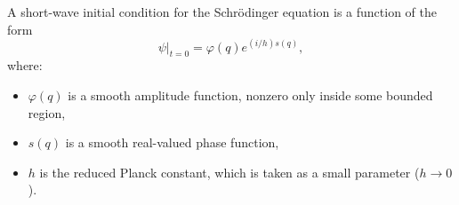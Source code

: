 A short-wave initial condition for the Schrödinger equation is a function of the form
$$\psi|_{t=0} = \varphi(q) e^{(i/h)s(q)},$$
where:
\begin{itemize}
\item $\varphi(q)$ is a smooth amplitude function, nonzero only inside some bounded region,
\item $s(q)$ is a smooth real-valued phase function,
\item $h$ is the reduced Planck constant, which is taken as a small parameter ($h \to 0$).
\end{itemize}
